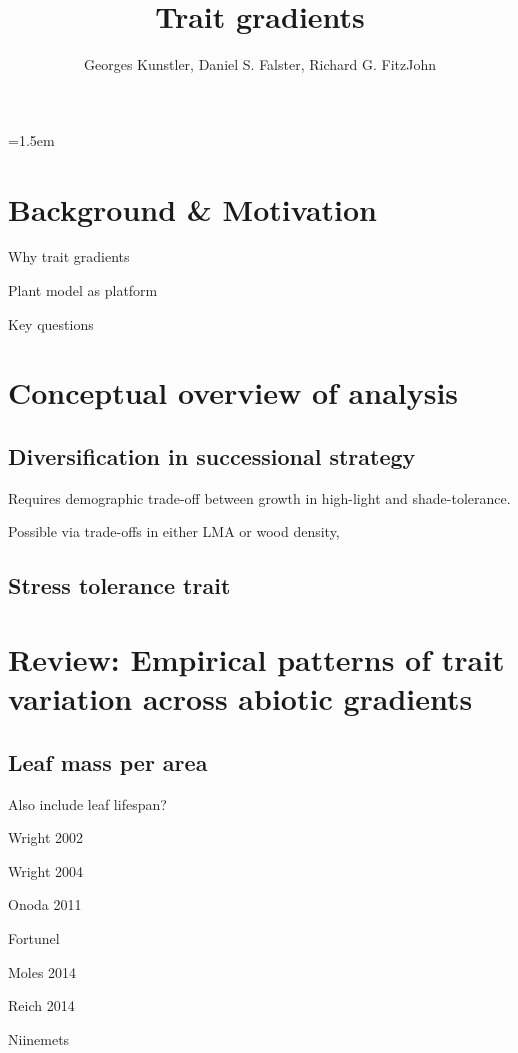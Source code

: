 \documentclass[a4paper,11pt]{article}
\title{Trait gradients}
\author{ Georges Kunstler, Daniel S. Falster, Richard G. FitzJohn}
\date{}
\affiliation{Department of Biological Sciences, Macquarie University,
  Sydney, Australia}
\begin{document}
\mstitleshort
\parindent=1.5em
\addtolength{\parskip}{.3em}


\section{Background \& Motivation}

Why trait gradients

Plant model as platform \citep{Falster-2016}

Key questions

\section{Conceptual overview of analysis}

\subsection{Diversification in successional strategy}

Requires demographic trade-off between growth in high-light and shade-tolerance.

Possible via trade-offs in either LMA or wood density,

\subsection{Stress tolerance trait}


\section{Review: Empirical patterns of trait variation across abiotic
gradients}


\subsection{Leaf mass per area}

Also include leaf lifespan?


Wright 2002

Wright 2004

Onoda 2011

Fortunel

Moles 2014

Reich 2014

Niinemets
\end{document}
